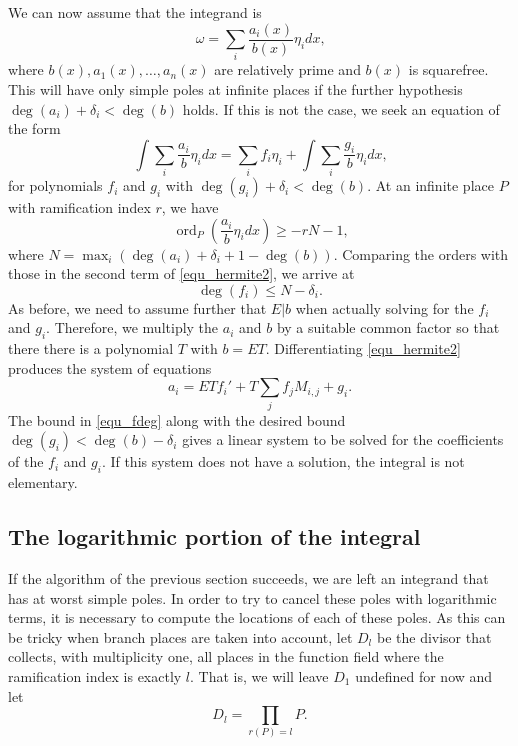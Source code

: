 \documentclass[12pt,reqno]{amsart}
\numberwithin{equation}{section}
\newcommand{\op}[1]  { \operatorname{ #1 }}
\begin{document}
We can now assume that the integrand is
\begin{equation*}
 \omega = \sum_i \frac{a_i(x)}{b(x)} \eta_i dx\text{,}
\end{equation*}
where $b(x),a_1(x),\dots,a_n(x)$ are relatively prime and $b(x)$ is squarefree. This will have only simple poles at infinite places if the further hypothesis $\operatorname{deg}(a_i) + \delta_i < \operatorname{deg}(b)$ holds. If this is not the case, we seek an equation of the form
\begin{equation}
\label{equ_hermite2}
\int \sum_{i} \frac{a_i}{b} \eta_i dx = \sum_{i} f_i \eta_i + \int \sum_{i} \frac{g_i}{b} \eta_i dx\text{,}
\end{equation}
for polynomials $f_i$ and $g_i$ with $\op{deg}(g_i)+\delta_i < \op{deg}(b)$. At an infinite place $P$ with ramification index $r$, we have
\begin{equation}
\label{equ_Ndef}
 \operatorname{ord}_P \left( \frac{a_i}{b} \eta_i dx \right) \ge -r N -1\text{,}
\end{equation}
where $N=\max_i(\operatorname{deg}(a_i)+\delta_i+1-\operatorname{deg}(b))$. Comparing the orders with those in the second term of \eqref{equ_hermite2}, we arrive at
\begin{equation}
\label{equ_fdeg}
\operatorname{deg}(f_i) \le N - \delta_i\text{.}
\end{equation}
As before, we need to assume further that $E|b$ when actually solving for the $f_i$ and $g_i$. Therefore, we multiply the $a_i$ and $b$ by a suitable common factor so that there there is a polynomial $T$ with $b=ET$. Differentiating \eqref{equ_hermite2} produces the system of equations
\begin{equation*}
 a_i = ET f_i' + T \sum_{j} f_j M_{i,j} + g_i\text{.}
\end{equation*}
The bound in \eqref{equ_fdeg} along with the desired bound $\operatorname{deg}(g_i) < \operatorname{deg}(b)-\delta_i$ gives a linear system to be solved for the coefficients of the $f_i$ and $g_i$. If this system does not have a solution, the integral is not elementary.



\subsection{The logarithmic portion of the integral}
If the algorithm of the previous section succeeds, we are left an integrand that has at worst simple poles. In order to try to cancel these poles with logarithmic terms, it is necessary to compute the locations of each of these poles. As this can be tricky when branch places are taken into account, let $D_l$ be the divisor that collects, with multiplicity one, all places in the function field where the ramification index is exactly $l$. That is, we will leave $D_1$ undefined for now and let
\begin{equation*}
 D_l = \prod_{ r(P)=l } P\text{.}
\end{equation*}
\end{document}

